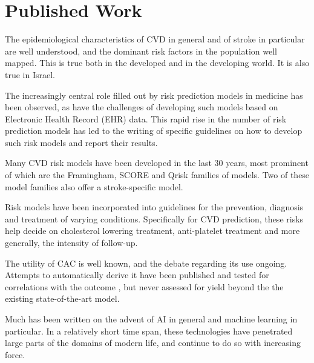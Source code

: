 \documentclass[a4paper,12pt]{article}
\begin{document}
	\section{Published Work}
	
	The epidemiological characteristics of CVD in general and of stroke in particular are well understood\cite{Koton2014,Vangen-Loenne2017}, and the dominant risk factors in the population well mapped\cite{Yusuf2004,ODonnell2016}. This is true both in the developed and in the developing world\cite{Lozano2012}. It is also true in Israel\cite{ICDC2017}.
	
	The increasingly central role filled out by risk prediction models in medicine has been observed\cite{Moons2009}, as have the challenges of developing such models based on Electronic Health Record (EHR) data\cite{Goldstein2016,Goldstein2017}. This rapid rise in the number of risk prediction models has led to the writing of specific guidelines on how to develop such risk models and report their results\cite{Collins2015}.
	
	Many CVD risk models have been developed in the last 30 years, most prominent of which are the Framingham\cite{Wilson1998,NationalCholesterolEducationProgramNCEPExpertPanelonDetection2002,DAgostino2008,Goff2014}, SCORE\cite{Conroy2003} and Qrisk\cite{Hippisley-Cox2007,Hippisley-Cox2008} families of models.	Two of these model families also offer a stroke-specific model\cite{Wolf1991,DAgostino1994,Hippisley-Cox2013}.
	
	Risk models have been incorporated into guidelines for the prevention, diagnosis and treatment of varying conditions. Specifically for CVD prediction, these risks help decide on cholesterol lowering treatment, anti-platelet treatment and more generally, the intensity of follow-up\cite{NationalCholesterolEducationProgramNCEPExpertPanelonDetection2002,Graham2007,Goff2014,Bibbins-Domingo2016}.
	
	The utility of CAC is well known\cite{Erbel2010}, and the debate regarding its use ongoing\cite{Greenland2018}. Attempts to automatically derive it have been published \cite{Isgum2012,Shadmi2018} and tested for correlations with the outcome \cite{Takx2015}, but never assessed for yield beyond the the existing state-of-the-art model\cite{Force2018}.
	
	Much has been written on the advent of AI in general and machine learning in particular. In a relatively short time span, these technologies have penetrated large parts of the domains of modern life, and continue to do so with increasing force\cite{Ng2017}.
	
\end{document}
